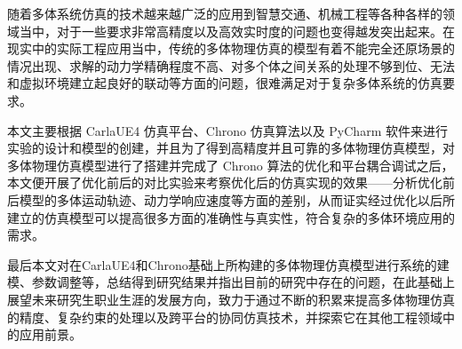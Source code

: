\begin{abstractzh}
	
	随着多体系统仿真的技术越来越广泛的应用到智慧交通、机械工程等各种各样的领域当中，对于一些要求非常高精度以及高效实时度的问题也变得越发突出起来。在现实中的实际工程应用当中，传统的多体物理仿真的模型有着不能完全还原场景的情况出现、求解的动力学精确程度不高、对多个体之间关系的处理不够到位、无法和虚拟环境建立起良好的联动等方面的问题，很难满足对于复杂多体系统的仿真要求。
	
	本文主要根据 CarlaUE4 仿真平台、Chrono 仿真算法以及 PyCharm 软件来进行实验的设计和模型的创建，并且为了得到高精度并且可靠的多体物理仿真模型，对多体物理仿真模型进行了搭建并完成了 Chrono 算法的优化和平台耦合调试之后，本文便开展了优化前后的对比实验来考察优化后的仿真实现的效果——分析优化前后模型的多体运动轨迹、动力学响应速度等方面的差别，从而证实经过优化以后所建立的仿真模型可以提高很多方面的准确性与真实性，符合复杂的多体环境应用的需求。
	
	最后本文对在CarlaUE4和Chrono基础上所构建的多体物理仿真模型进行系统的建模、参数调整等，总结得到研究结果并指出目前的研究中存在的问题，在此基础上展望未来研究生职业生涯的发展方向，致力于通过不断的积累来提高多体物理仿真的精度、复杂约束的处理以及跨平台的协同仿真技术，并探索它在其他工程领域中的应用前景。
	
	
	
	
	
	
\end{abstractzh}